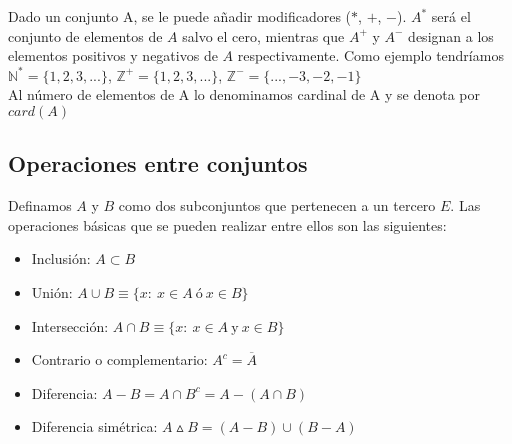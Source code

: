 Dado un conjunto A, se le puede añadir modificadores ($*$, $+$, $-$). $A^*$ será el conjunto de elementos de $A$ salvo el cero, mientras que $A^+$ y $A^-$ designan a los elementos positivos y negativos de $A$ respectivamente. Como ejemplo tendríamos $\mathbb{N}^*=\lbrace 1,2,3,... \rbrace$, $\mathbb{Z}^+=\lbrace 1,2,3,... \rbrace$, $\mathbb{Z}^-=\lbrace ...,-3,-2,-1\rbrace$\\

Al número de elementos de A lo denominamos cardinal de A y se denota por $card(A)$


\subsection*{Operaciones entre conjuntos}
Definamos $A$ y $B$ como dos subconjuntos que pertenecen a un tercero $E$. Las operaciones básicas que se pueden realizar entre ellos son las siguientes:

\begin{itemize}
\item Inclusión: $A\subset B$
\begin{figure}[h]
\centering

\end{figure}

\item Unión: $A \cup B \equiv \lbrace x: \ x \in A\ \text{ó} \ x \in B\rbrace$

\begin{figure}[h]
\centering

\end{figure}

\item Intersección: $A \cap B \equiv \lbrace x: \ x \in A\ \text{y} \ x \in B\rbrace$

\begin{figure}[h]
\centering

\end{figure}
\newpage

\item Contrario o complementario: $A^c = \overline{A}$

\begin{figure}[h]
\centering

\end{figure}


\item Diferencia: $A-B=A\cap B^c=A-(A\cap B)$

\begin{figure}[h]
\centering

\end{figure}

\item Diferencia simétrica: $A\vartriangle B=(A-B)\cup (B-A)$

\begin{figure}[h]
\centering

\end{figure}

\end{itemize}

